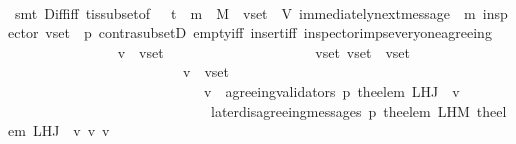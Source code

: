 \begin{isabellebody}
\ \ \ \ \ \ \isamarkupfalse%
\ {\isacharparenleft}smt\ Diff{\isacharunderscore}iff\ {\isasymSigma}t{\isacharunderscore}is{\isacharunderscore}subset{\isacharunderscore}of{\isacharunderscore}{\isasymSigma}\ {\isacartoucheopen}{\isasymsigma}\ {\isasymin}\ {\isasymSigma}t\ {\isasymand}\ m\ {\isasymin}\ M\ {\isasymand}\ v{\isacharunderscore}set\ {\isasymsubseteq}\ V{\isacartoucheclose}\ {\isacartoucheopen}immediately{\isacharunderscore}next{\isacharunderscore}message\ {\isacharparenleft}{\isasymsigma}{\isacharcomma}\ m{\isacharparenright}{\isacartoucheclose}\ {\isacartoucheopen}inspector\ {\isacharparenleft}v{\isacharunderscore}set{\isacharcomma}\ {\isasymsigma}{\isacharcomma}\ p{\isacharparenright}{\isacartoucheclose}\ contra{\isacharunderscore}subsetD\ empty{\isacharunderscore}iff\ insert{\isacharunderscore}iff\ inspector{\isacharunderscore}imps{\isacharunderscore}everyone{\isacharunderscore}agreeing{\isacharparenright}\isanewline
\ \ \isamarkupfalse%
\ \ \ \ \ \ \isanewline
\ \ \isanewline
\ \ \isamarkupfalse%
\ \isamarkupfalse%
\ {\isachardoublequoteopen}{\isasymforall}\ v\ {\isasymin}\ v{\isacharunderscore}set{\isachardot}\isanewline
\ \ \ \ \ \ \ \ \ \ \ \ \ \ \ \ \ \ \ \ {\isacharparenleft}{\isasymforall}\ v{\isacharunderscore}set{\isacharprime}{\isachardot}\ v{\isacharunderscore}set{\isacharprime}\ {\isasymsubseteq}\ v{\isacharunderscore}set\ {\isasymand}\isanewline
\ \ \ \ \ \ \ \ \ \ \ \ \ \ \ \ \ \ \ \ \ \ \ \ {\isacharparenleft}{\isasymforall}\ v{\isacharprime}\ {\isasymin}\ v{\isacharunderscore}set{\isacharprime}{\isachardot}\ \isanewline
\ \ \ \ \ \ \ \ \ \ \ \ \ \ \ \ \ \ \ \ \ \ \ \ \ \ \ \ v{\isacharprime}\ {\isasymin}\ agreeing{\isacharunderscore}validators\ {\isacharparenleft}p{\isacharcomma}\ {\isacharparenleft}the{\isacharunderscore}elem\ {\isacharparenleft}L{\isacharunderscore}H{\isacharunderscore}J\ {\isasymsigma}\ v{\isacharparenright}{\isacharparenright}{\isacharparenright}\isanewline
\ \ \ \ \ \ \ \ \ \ \ \ \ \ \ \ \ \ \ \ \ \ \ \ \ \ \ \ {\isasymand}\ later{\isacharunderscore}disagreeing{\isacharunderscore}messages\ {\isacharparenleft}p{\isacharcomma}\ the{\isacharunderscore}elem\ {\isacharparenleft}L{\isacharunderscore}H{\isacharunderscore}M\ {\isacharparenleft}the{\isacharunderscore}elem\ {\isacharparenleft}L{\isacharunderscore}H{\isacharunderscore}J\ {\isasymsigma}\ v{\isacharparenright}{\isacharparenright}\ v{\isacharprime}{\isacharparenright}{\isacharcomma}\ v{\isacharprime}{\isacharcomma}\ {\isasymsigma}{\isacharparenright}\ {\isacharequal}\ {\isasymemptyset}{\isacharparenright}\isanewline

\end{isabellebody}
